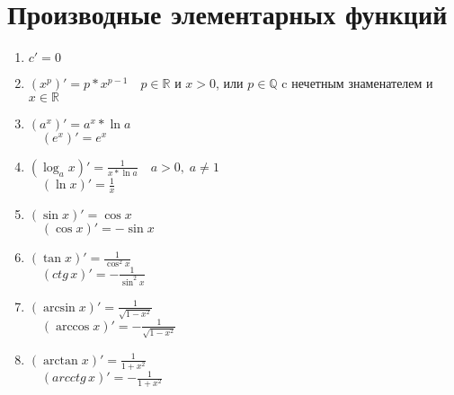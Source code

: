 \section{Производные элементарных функций \href{https://youtu.be/OXDjegAsmSU?t=3881}{\Walley}}
\begin{enumerate}
    \item $c' = 0$
    \item $(x^p)' = p * x^{p - 1} \quad p \in \mathbb{R}$ и $x > 0$, или $p \in \mathbb{Q}$ c нечетным знаменателем и $x \in \mathbb{R}$
    \item $(a^x)' = a^x * \ln a$ \\
    $\quad (e^x)' = e^x$
    \item $(\log_a x)' = \frac{1}{x * \ln a} \quad a > 0, \; a \neq 1$ \\
    $\quad (\ln x)' = \frac{1}{x}$
    \item $(\sin x)' = \cos x$ \\
    $\quad (\cos x)' = -\sin x$
    \item $(\tan x)' = \frac{1}{\cos^2 x}$ \\
    $\quad (ctg \, x)' = -\frac{1}{\sin^2 x} $
    \item $(\arcsin x)' = \frac{1}{\sqrt{1 - x^2}}$ \\
    $\quad (\arccos x)' = -\frac{1}{\sqrt{1 - x^2}}$ 
    \item $(\arctan x)' = \frac{1}{1 + x^2}$ \\
    $\quad (arcctg \, x)' = - \frac{1}{1 + x^2}$
\end{enumerate}
